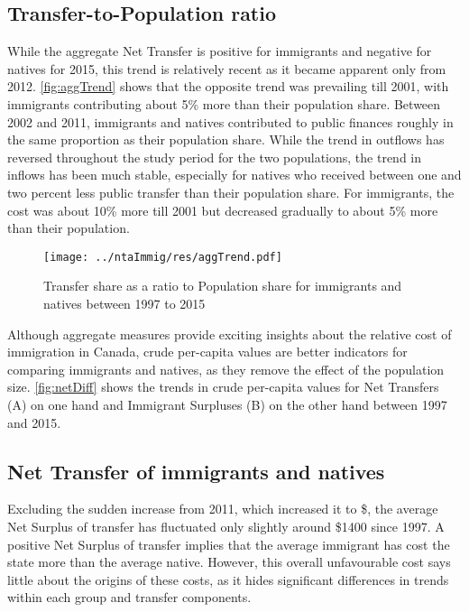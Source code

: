 \subsection{Transfer-to-Population ratio}
While the aggregate Net Transfer is positive for immigrants and negative for natives for 2015, this trend is relatively recent as it became apparent only from 2012.
\autoref{fig:aggTrend} shows that the opposite trend was prevailing till 2001, with immigrants contributing about 5\% more than their population share.
Between 2002 and 2011, immigrants and natives contributed to public finances roughly in the same proportion as their population share.
While the trend in outflows has reversed throughout the study period for the two populations, the trend in inflows has been much stable, especially for natives who received between one and two percent less public transfer than their population share.
For immigrants, the cost was about 10\% more till 2001 but decreased gradually to about 5\% more than their population.

  \begin{figure}[H]%
    \caption{Transfer share as a ratio to Population share for immigrants and natives between 1997 to 2015}
    \texttt{[image: ../ntaImmig/res/aggTrend.pdf]}%
    \label{fig:aggTrend}%
  \end{figure}%

Although aggregate measures provide exciting insights about the relative cost of immigration in Canada, crude per-capita values are better indicators for comparing immigrants and natives, as they remove the effect of the population size. \autoref{fig:netDiff} shows the trends in crude per-capita values for Net Transfers (A) on one hand and Immigrant Surpluses (B) on the other hand between 1997 and 2015.

\subsection{Net Transfer of immigrants and natives}
Excluding the sudden increase from 2011, which increased it to \$, the average Net Surplus of transfer has fluctuated only slightly around \$1400 since 1997.
A positive Net Surplus of transfer implies that the average immigrant has cost the state more than the average native.
However, this overall unfavourable cost says little about the origins of these costs, as it hides significant differences in trends within each group and transfer components.

